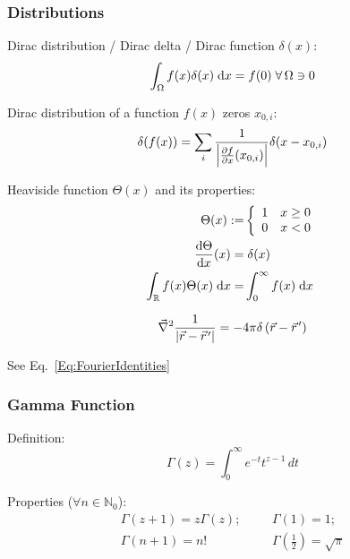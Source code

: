 		\subsubsection{Distributions}
			\noindent
			Dirac distribution / Dirac delta / Dirac function $\delta(x)$:
			\begin{equation}
				\int_\Omega f(x)\delta(x)\;\mathrm{d} x = f(0)\;\forall\, \Omega\ni 0
			\end{equation}

			\noindent
			Dirac distribution of a function $f(x)$ zeros $x_{0,i}$:
			\begin{equation}
				\delta(f(x)) = \sum_i \frac{1}{\left|\frac{\partial f}{\partial x}(x_{0,i})\right|}\delta(x-x_{0,i})
			\end{equation}

			\noindent
			Heaviside function $\Theta(x)$ and its properties:
			\begin{equation}
				\begin{aligned}
					\Theta(x) :=& \left\{\begin{array}{ll}
						1 & x\ge 0 \\
						0 & x<0 \\
						\end{array}\right. \\
						\frac{\mathrm{d} \Theta}{\mathrm{d} x}(x) =&\; \delta(x) \\
					\int_{\mathbb{R}} f(x)\Theta(x)\;\mathrm{d} x =& \int_{0}^{\infty} f(x)\;\mathrm{d} x
				\end{aligned}
			\end{equation}

			\begin{equation}
				\Nabla^2\frac{1}{\left|\vec{r} - \pvec{r}'\right|} = -4\pi\delta\left(\vec{r} - \pvec{r}'\right)
			\end{equation}

			\noindent
			See Eq.~\ref{Eq:FourierIdentities}

		\subsubsection{Gamma Function}
			\noindent
			Definition:
			\begin{equation}
				\Gamma(z)=\int_0^{\infty}e^{-t}t^{z-1}\,dt
			\end{equation}

			\noindent
			Properties ($\forall n\in\mathbb{N}_0$):
			\begin{equation}
				\begin{array}{cc}
					\Gamma(z+1)=z\Gamma(z);
					&\hspace{20pt} \Gamma\left(1 \right)=1; \\
					\Gamma(n+1) = n!
					&\hspace{20pt} \Gamma\left(\frac{1}{2} \right)=\sqrt{\pi} \\
				\end{array}
			\end{equation}

